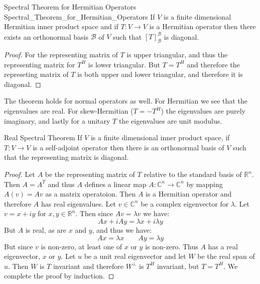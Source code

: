 \documentclass{article}                                                        %
\begin{document}
        \begin{ftheorem}{Spectral Theorem for Hermitian Operators}
                        {Spectral_Theorem_for_Hermitian_Operators}
            If $V$ is a finite dimensional Hermitian inner product space and if
            $T:V\rightarrow{V}$ is a Hermitian operator then there exists an
            orthonormal basis $\mathscr{B}$ of $V$ such that
            $[T]_{\mathscr{B}}^{\mathscr{B}}$ is diagonal.
        \end{ftheorem}
        \begin{proof}
            For the representing matrix of $T$ is upper triangular, and thus the
            representing matrix for $T^{H}$ is lower triangular. But $T=T^{H}$
            and therefore the represeting matrix of $T$ is both upper and lower
            triangular, and therefore it is diagonal.
        \end{proof}
        The theorem holds for normal operators as well. For Hermitian we see
        that the eigenvalues are real. For skew-Hermitian ($T=\minus{T}^{H}$)
        the eigenvalues are purely imaginary, and lastly for a unitary $T$ the
        eigenvalues are unit modulus.
        \begin{ftheorem}{Real Spectral Theorem}
            If $V$ is a finite dimensional inner product space, if
            $T:V\rightarrow{V}$ is a self-adjoint operator then there is an
            orthonormal basis of $V$ such that the representing matrix is
            diagonal.
        \end{ftheorem}
        \begin{proof}
            Let $A$ be the representing matrix of $T$ relative to the standard
            basis of $\mathbb{R}^{n}$. Then $A=A^{T}$ and thus $A$ defines a
            linear map $A:\mathbb{C}^{n}\rightarrow\mathbb{C}^{n}$ by mapping
            $A(v)=Av$ as a matrix operatoion. Then $A$ is a Hermitian operator
            and therefore $A$ has real eigenvalues. Let $v\in\mathbb{C}^{n}$ be
            a complex eigenvector for $\lambda$. Let $v=x+iy$ for
            $x,y\in\mathbb{R}^{n}$. Then since $Av=\lambda{v}$ we have:
            \begin{equation}
                Ax+iAy=\lambda{x}+i\lambda{y}
            \end{equation}
            But $A$ is real, as are $x$ and $y$, and thus we have:
            \begin{equation}
                Ax=\lambda{x}
                \quad\quad
                Ay=\lambda{y}
            \end{equation}
            But since $v$ is non-zero, at least one of $x$ or $y$ is non-zero.
            Thus $A$ has a real eigenvector, $x$ or $y$. Let $u$ be a unit
            real eigenvector and let $W$ be the real span of $u$. Then $W$ is
            $T$ invariant and therefore $W^{\perp}$ is $T^{H}$ invariant, but
            $T=T^{H}$. We complete the proof by induction.
        \end{proof}
\end{document}
